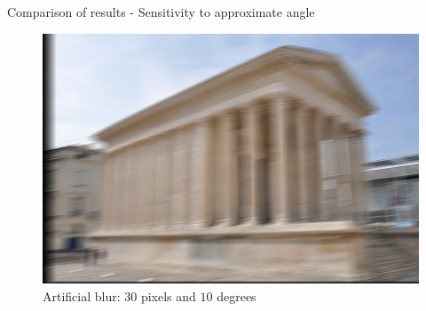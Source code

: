 \begin{frame}[allowframebreaks]{Comparison of results - Sensitivity to approximate angle}

\begin{figure}
\centering
\includegraphics[scale = 0.2]{../Images/Results/NimeAngle/Blurlength30angle10.png}
\caption{Artificial blur: $30$ pixels and $10$ degrees}
\label{fig:nimeOriginal}
\end{figure}


\end{frame}
